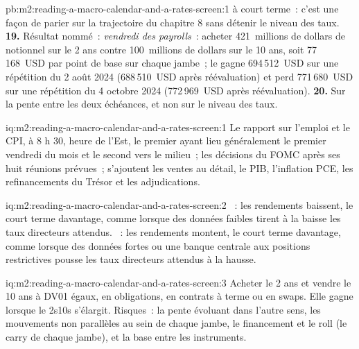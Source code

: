 \begin{solution}{pb:m2:reading-a-macro-calendar-and-a-rates-screen:1}
à court terme~: c'est une façon de parier sur la trajectoire du chapitre 8 sans détenir le niveau des taux.
\textbf{19.} Résultat nommé~: \emph{vendredi des payrolls}~: acheter 421~millions de dollars de notionnel sur le 2 ans
contre 100~millions de dollars sur le 10 ans, soit 77\,168~USD par point de base sur chaque jambe~; le
 gagne 694\,512~USD sur une répétition du 2 août 2024 (688\,510~USD après réévaluation) et perd
771\,680~USD sur une répétition du 4 octobre 2024 (772\,969~USD après réévaluation).
\textbf{20.} Sur la pente entre les deux échéances, et non sur le niveau des taux.
\end{solution}

\begin{solution}{iq:m2:reading-a-macro-calendar-and-a-rates-screen:1}
Le rapport sur l'emploi et le CPI, à 8 h 30, heure de l'Est, le premier ayant lieu
généralement le premier vendredi du mois et le second vers le milieu~; les décisions du FOMC après ses huit
réunions prévues~; s'ajoutent les ventes au détail, le PIB, l'inflation PCE, les refinancements du Trésor et
les adjudications.
\end{solution}

\begin{solution}{iq:m2:reading-a-macro-calendar-and-a-rates-screen:2}
~: les rendements baissent, le court terme davantage, comme lorsque des données faibles tirent
à la baisse les taux directeurs attendus. ~: les rendements montent, le court terme davantage, comme lorsque des données fortes ou une
banque centrale aux positions restrictives pousse les taux directeurs attendus à la hausse.
\end{solution}

\begin{solution}{iq:m2:reading-a-macro-calendar-and-a-rates-screen:3}
Acheter le 2 ans et vendre le 10 ans à DV01 égaux, en obligations, en contrats à terme ou en swaps. Elle
gagne lorsque le 2s10s s'élargit. Risques~: la pente évoluant dans l'autre sens, les mouvements non parallèles au sein
de chaque jambe, le financement et le roll (le carry de chaque jambe), et la base entre les instruments.
\end{solution}

